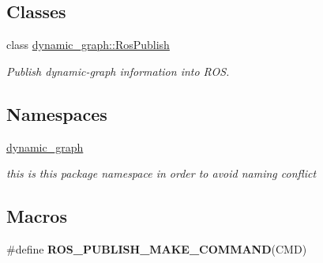 \subsection*{Classes}
\begin{DoxyCompactItemize}
\item 
class \hyperlink{classdynamic__graph_1_1RosPublish}{dynamic\+\_\+graph\+::\+Ros\+Publish}
\begin{DoxyCompactList}\small\item\em Publish dynamic-\/graph information into R\+OS. \end{DoxyCompactList}\end{DoxyCompactItemize}
\subsection*{Namespaces}
\begin{DoxyCompactItemize}
\item 
 \hyperlink{namespacedynamic__graph}{dynamic\+\_\+graph}
\begin{DoxyCompactList}\small\item\em this is this package namespace in order to avoid naming conflict \end{DoxyCompactList}\end{DoxyCompactItemize}
\subsection*{Macros}
\begin{DoxyCompactItemize}
\item 
\#define {\bfseries R\+O\+S\+\_\+\+P\+U\+B\+L\+I\+S\+H\+\_\+\+M\+A\+K\+E\+\_\+\+C\+O\+M\+M\+A\+ND}(C\+MD)
\end{DoxyCompactItemize}
